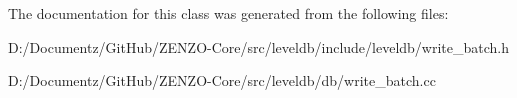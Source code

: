 The documentation for this class was generated from the following files\+:\begin{DoxyCompactItemize}
\item 
D\+:/\+Documentz/\+Git\+Hub/\+Z\+E\+N\+Z\+O-\/\+Core/src/leveldb/include/leveldb/write\+\_\+batch.\+h\item 
D\+:/\+Documentz/\+Git\+Hub/\+Z\+E\+N\+Z\+O-\/\+Core/src/leveldb/db/write\+\_\+batch.\+cc\end{DoxyCompactItemize}
